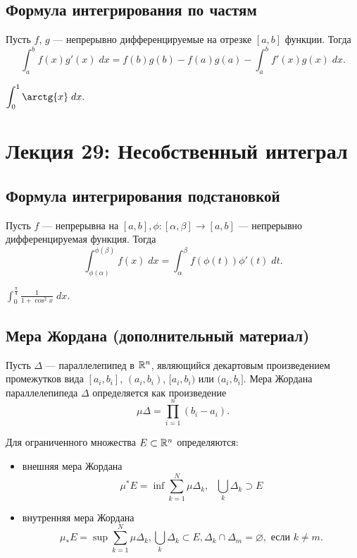     \subsection{Формула интегрирования по частям}
    
    \begin{theorem}
    	Пусть $f$, $g$ — непрерывно дифференцируемые на отрезке $[a, b]$ функции. Тогда
    	\[ \int_a^b f(x)g'(x) \; dx = f(b)g(b) - f(a)g(a) - \int_a^b f'(x)g(x) \; dx. \]
    \end{theorem}
    
    \begin{example}
    	$\displaystyle\int_0^1 \arctg{x} \; dx.$
    \end{example}
    
    \newpage
    
    \section{Лекция 29: Несобственный интеграл}
    
    \subsection{Формула интегрирования подстановкой}
    
    \begin{theorem}
    	Пусть $f$ — непрерывна на $[a, b], \phi: [\alpha, \beta] \rightarrow [a, b]$ — непрерывно дифференцируемая функция. Тогда
    	\[ \int_{\phi(\alpha)}^{\phi(\beta)} f(x) \; dx = \int_{\alpha}^{\beta} f(\phi(t))\phi'(t) \; dt. \]
    \end{theorem}
    
    \begin{example}
    	$\displaystyle\int_0^{\frac{\pi}{4}} \frac{1}{1 + \cos^2{x}} \; dx.$
    \end{example}
    
    \subsection{Мера Жордана (дополнительный материал)}
    Пусть $\Delta$ — параллелепипед в $\mathbb R^n$, являющийся декартовым произведением промежутков вида $[a_i, b_i]$, $(a_i, b_i)$, $[a_i, b_i)$ или $(a_i, b_i]$. Мера Жордана параллелепипеда $\Delta$ определяется как
    произведение
    \[ \mu\Delta = \prod_{i = 1}^{n} (b_i - a_i). \]
    
    Для ограниченного множества $E \subset \mathbb R^n$ определяются:
    \begin{itemize}
    	\item внешняя мера Жордана
    	\[ \mu^{*}E = \inf{\sum_{k = 1}^{N} \mu \Delta_k}, \text{   } \bigcup_k{\Delta_k} \supset E \]
    	\item внутренняя мера Жордана
    	\[ \mu_{*}E = \sup{\sum_{k = 1}^{N} \mu \Delta_k}, \bigcup_k{\Delta_k} \subset E, \Delta_k \cap \Delta_m = \varnothing, \text{ если } k \neq m. \]
    \end{itemize}
    
